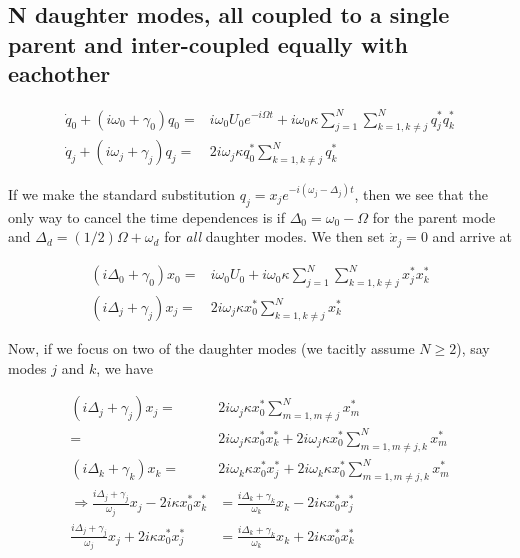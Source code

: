\subsection*{N daughter modes, all coupled to a single parent and inter-coupled equally with eachother}

\begin{subequations}
\begin{align}
\dot{q}_0 + (i\omega_0 + \gamma_0)q_0 = & i\omega_0 U_0 e^{-i\Omega t} + i\omega_0 \kappa \sum_{j=1}^N \sum_{k=1, k\neq j}^N q_j^\ast q_k^\ast \\
\dot{q}_j + (i\omega_j + \gamma_j)q_j = & 2i\omega_j \kappa q_0^\ast \sum_{k =1,k\neq j}^N q_k^\ast
\end{align}
\end{subequations}

If we make the standard substitution $q_j = x_j e^{-i(\omega_j - \Delta_j)t}$, then we see that the only way to cancel the time dependences is if $\Delta_0 = \omega_0 - \Omega$ for the parent mode and $\Delta_d = (1/2)\Omega + \omega_d$ for {\em all} daughter modes. We then set $\dot{x}_j = 0$ and arrive at

\begin{subequations}
\begin{align}
(i\Delta_0 + \gamma_0) x_0 = & i\omega_0 U_0 + i\omega_0\kappa \sum_{j=1}^N \sum_{k=1, k \neq j}^N x_j^\ast x_k^\ast \\
(i\Delta_j + \gamma_j) x_j = & 2i\omega_j\kappa x_0^\ast \sum_{k=1 , k \neq j}^N x_k^\ast
\end{align}
\end{subequations}

Now, if we focus on two of the daughter modes (we tacitly assume $N\geq2$), say modes $j$ and $k$, we have

\begin{subequations}
\begin{align}
(i\Delta_j + \gamma_j) x_j = & 2i\omega_j\kappa x_0^\ast \sum_{m=1, m\neq j}^N x_m^\ast \\
                           = & 2i\omega_j\kappa x_0^\ast x_k^\ast + 2i\omega_j\kappa x_0^\ast \sum_{m=1, m\neq j,k}^N x_m^\ast \\
(i\Delta_k + \gamma_k) x_k = & 2i\omega_k\kappa x_0^\ast x_j^\ast + 2i\omega_k\kappa x_0^\ast \sum_{m=1, m\neq j,k}^N x_m^\ast \\
\Rightarrow \frac{i\Delta_j + \gamma_j}{\omega_j} x_j - 2i\kappa x_0^\ast x_k^\ast & = \frac{i\Delta_k + \gamma_k}{\omega_k} x_k - 2i\kappa x_0^\ast x_j^\ast \\
            \frac{i\Delta_j + \gamma_j}{\omega_j} x_j + 2i\kappa x_0^\ast x_j^\ast & = \frac{i\Delta_k + \gamma_k}{\omega_k} x_k + 2i\kappa x_0^\ast x_k^\ast \label{subeq:Nd_universality}
\end{align}
\end{subequations}


